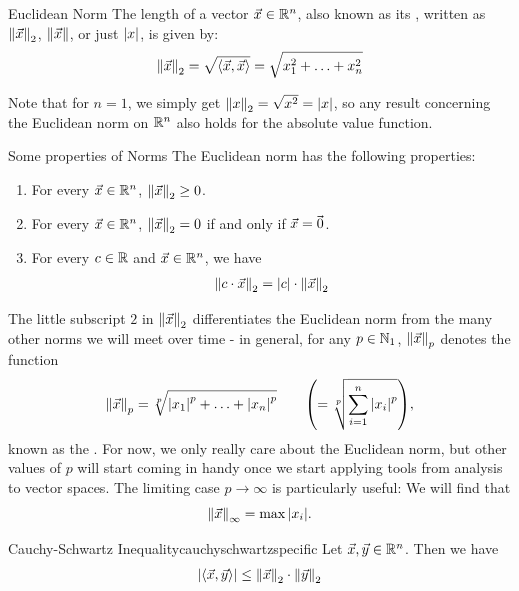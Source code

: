 \begin{importantdefinition}{Euclidean Norm}{}
	The length of a vector $\vec{x} \in \mathbb{R}^n$, also known as its , written as $\norm{\vec{x}}_2$, $\norm{\vec{x}}$, or just $\abs{x}$, is given by:
	\begin{align*}
		\norm{\vec{x}}_2 = \sqrt{\left\langle \vec{x}, \vec{x} \right\rangle} = \sqrt{x_1^2 + \hdots + x_n^2}
	\end{align*}
\end{importantdefinition}
Note that for $n = 1$, we simply get $\norm{x}_2 = \sqrt{x^2} = \abs{x}$, so any result concerning the Euclidean norm on $\mathbb{R}^n$ also holds for the absolute value function.
\begin{importanttheorem}{Some properties of Norms}{}
	The Euclidean norm has the following properties:
	\begin{enumerate}
		\item {} For every $\vec{x} \in \mathbb{R}^n$, $\norm{\vec{x}}_2 \geq 0$.
		\item {} For every $\vec{x} \in \mathbb{R}^n$, $\norm{\vec{x}}_2 = 0$ if and only if $\vec{x} = \kern-1.2pt\vec{\kern1.2pt 0}$.
		\item {} For every $c \in \mathbb{R}$ and $\vec{x} \in \mathbb{R}^n$, we have
		\begin{align*}
			\norm{c \cdot \vec{x}}_2 = \abs{c} \cdot \norm{\vec{x}}_2
		\end{align*}
	\end{enumerate}
\end{importanttheorem}
The little subscript $2$ in $\norm{\vec{x}}_2$ differentiates the Euclidean norm from the many other norms we will meet over time - in general, for any $p \in \mathbb{N}_1$, $\norm{\vec{x}}_p$ denotes the function
\begin{align*}
	\norm{\vec{x}}_p = \sqrt[p]{\abs{x_1}^p + \hdots + \abs{x_n}^p} \qquad\qty(= \sqrt[p]{\sum_{i = 1}^n \abs{x_i}^p}),
\end{align*}
known as the . For now, we only really care about the Euclidean norm, but other values of $p$ will start coming in handy once we start applying tools from analysis to vector spaces. The limiting case $p \to \infty$ is particularly useful: We will find that $$\norm{\vec{x}}_\infty = \max \abs{x_i}.$$
\begin{importanttheorem}{Cauchy-Schwartz Inequality}{cauchyschwartzspecific}
	Let $\vec{x}, \vec{y} \in \mathbb{R}^n$. Then we have
	\begin{align*}
		\abs{\left\langle \vec{x}, \vec{y} \right\rangle} \leq \norm{\vec{x}}_2 \cdot \norm{\vec{y}}_2
	\end{align*}
\end{importanttheorem}
